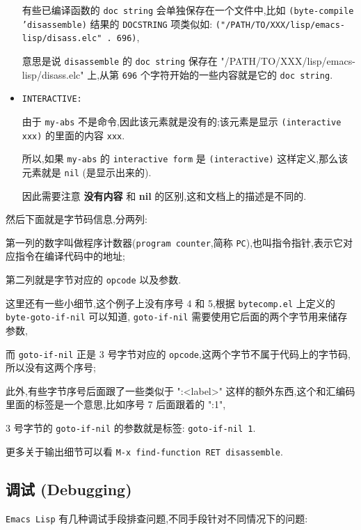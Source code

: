 \documentclass[11pt]{article}
\begin{document}
\begin{itemize}
有些已编译函数的 \texttt{doc string} 会单独保存在一个文件中,比如 \texttt{(byte-compile 'disassemble)} 结果的 \texttt{DOCSTRING} 项类似如: \texttt{("/PATH/TO/XXX/lisp/emacs-lisp/disass.elc" . 696)},

意思是说 \texttt{disassemble} 的 \texttt{doc string} 保存在 "/PATH/TO/XXX/lisp/emacs-lisp/disass.elc" 上,从第 \texttt{696} 个字符开始的一些内容就是它的 \texttt{doc string}.

\item \texttt{INTERACTIVE:}

由于 \texttt{my-abs} 不是命令,因此该元素就是没有的;该元素是显示 \texttt{(interactive xxx)} 的里面的内容 \texttt{xxx}.

所以,如果 \texttt{my-abs} 的 \texttt{interactive form} 是 \texttt{(interactive)} 这样定义,那么该元素就是 \texttt{nil} (是显示出来的).

因此需要注意 \textbf{没有内容} 和 \textbf{nil} 的区别,这和文档上的描述是不同的.
\end{itemize}


然后下面就是字节码信息,分两列:

第一列的数字叫做程序计数器(\texttt{program counter},简称 \texttt{PC}),也叫指令指针,表示它对应指令在编译代码中的地址;

第二列就是字节对应的 \texttt{opcode} 以及参数.

这里还有一些小细节,这个例子上没有序号 4 和 5,根据 \texttt{bytecomp.el} 上定义的 \texttt{byte-goto-if-nil} 可以知道, \texttt{goto-if-nil} 需要使用它后面的两个字节用来储存参数,

而 \texttt{goto-if-nil} 正是 3 号字节对应的 \texttt{opcode},这两个字节不属于代码上的字节码,所以没有这两个序号;

此外,有些字节序号后面跟了一些类似于 ":<label>" 这样的额外东西,这个和汇编码里面的标签是一个意思,比如序号 7 后面跟着的 ":1",

3 号字节的 \texttt{goto-if-nil} 的参数就是标签: \texttt{goto-if-nil 1}.

更多关于输出细节可以看 \texttt{M-x find-function RET disassemble}.


\subsection{调试 (Debugging)}
\label{sec:org4ccd253}

\texttt{Emacs Lisp} 有几种调试手段排查问题,不同手段针对不同情况下的问题:
\end{document}
